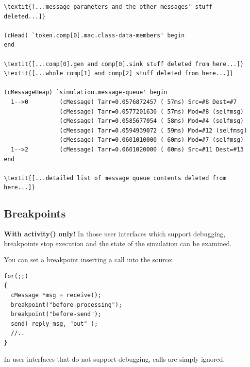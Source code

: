 \begin{Verbatim}[commandchars=\\\{\}]
\textit{[...message parameters and the other messages' stuff deleted...]}

(cHead) `token.comp[0].mac.class-data-members' begin
end

\textit{[...comp[0].gen and comp[0].sink stuff deleted from here...]}
\textit{[...whole comp[1] and comp[2] stuff deleted from here...]}

(cMessageHeap) `simulation.message-queue' begin
  1-->0         (cMessage) Tarr=0.0576872457 ( 57ms) Src=#8 Dest=#7
                (cMessage) Tarr=0.0577201630 ( 57ms) Mod=#8 (selfmsg)
                (cMessage) Tarr=0.0585677054 ( 58ms) Mod=#4 (selfmsg)
                (cMessage) Tarr=0.0594939072 ( 59ms) Mod=#12 (selfmsg)
                (cMessage) Tarr=0.0601010000 ( 60ms) Mod=#7 (selfmsg)
  1-->2         (cMessage) Tarr=0.0601020000 ( 60ms) Src=#11 Dest=#13
end

\textit{[...detailed list of message queue contents deleted from here...]}
\end{Verbatim}





\subsection{Breakpoints}

\textbf{With activity() only!} In those user interfaces which support
debugging, breakpoints stop execution and the state of the simulation
can be examined.

You can set a breakpoint inserting a
 call into the source:

\begin{verbatim}
for(;;)
{
  cMessage *msg = receive();
  breakpoint("before-processing");
  breakpoint("before-send");
  send( reply_msg, "out" );
  //..
}
\end{verbatim}


In user interfaces that do not support debugging, 
calls are simply ignored.





%
%
%
%






